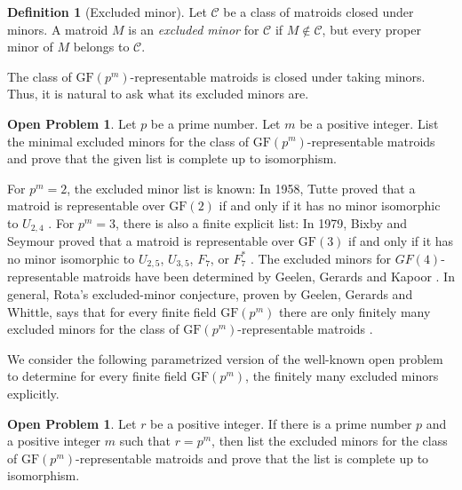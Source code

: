 \documentclass[12pt]{article}
\numberwithin{equation}{section}
\theoremstyle{definition}
\newtheorem{definition}{Definition}
\newtheorem{openproblem}[theorem]{Open Problem}
\begin{document}
\begin{definition}[Excluded minor]
Let $\mathcal C$ be a class of matroids closed under minors. A matroid $M$ is an \emph{excluded minor} for $\mathcal C$ if $M\notin \mathcal C$, but every proper minor of $M$ belongs to $\mathcal C$.
\end{definition}

The class of $\mathrm{GF}(p^m)$-representable matroids is closed under taking minors. Thus, it is natural to ask what its excluded minors are.

\begin{openproblem}
Let $p$ be a prime number. Let $m$ be a positive integer. List the minimal excluded minors for the class of $\mathrm{GF}(p^m)$-representable matroids and prove that the given list is complete up to isomorphism.
\end{openproblem}

For $p^m=2$, the excluded minor list is known: In 1958, Tutte proved that a matroid is representable over $\mathrm{GF}(2)$ if and only if it has no minor isomorphic to $U_{2,4}$ \cite{Tutte1958Homotopy}. For $p^m=3$, there is also a finite explicit list: In 1979, Bixby and Seymour proved that a matroid is representable over $\mathrm{GF}(3)$ if and only if it has no minor isomorphic to $U_{2,5}$, $U_{3,5}$, $F_7$, or $F_7^*$ \cite{Bixby1979Reid,Seymour1979GF3}.
The excluded minors for $GF(4)$-representable matroids have been determined by Geelen, Gerards and Kapoor \cite{GeelenGerardsKapoor2000GF4}.
In general, Rota's excluded-minor conjecture, proven by Geelen, Gerards and Whittle, says that for every finite field $\mathrm{GF}(p^m)$ there are only finitely many excluded minors for the class of $\mathrm{GF}(p^m)$-representable matroids \cite{Rota1971Combinatorial, GeelenGerardsWhittle2014Solving}. 

We consider the following parametrized version of the well-known open problem to determine  for every finite field $\mathrm{GF}(p^m)$, the finitely many excluded minors explicitly.
\begin{openproblem}
Let $r$ be a positive integer. If there is a prime number $p$ and a positive integer $m$ such that $r=p^m$, then list the excluded minors for the class of $\mathrm{GF}(p^m)$-representable matroids and prove that the list is complete up to isomorphism.
\end{openproblem}

\printbibliography
\end{document}
